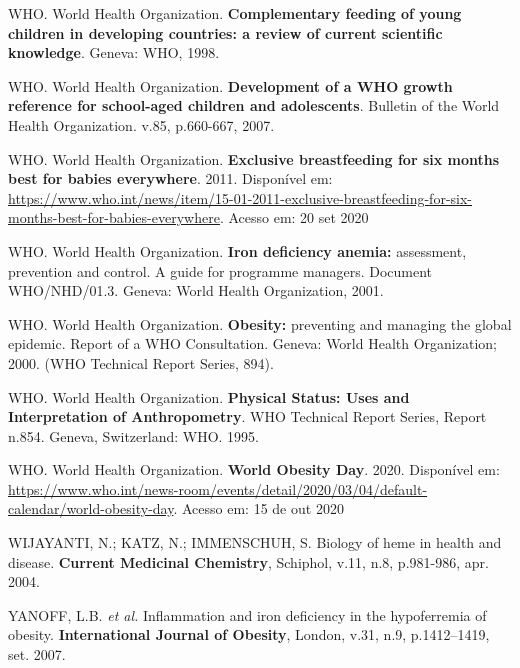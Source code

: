 \noindent WHO. World Health Organization. \textbf{Complementary feeding of young children in developing countries: a review of current scientific knowledge}. Geneva: WHO, 1998.

\bigbreak

\noindent WHO. World Health Organization. \textbf{Development of a WHO growth reference for school-aged children and adolescents}. Bulletin of the World Health Organization. v.85, p.660-667, 2007. 

\bigbreak

\noindent WHO. World Health Organization. \textbf{Exclusive breastfeeding for six months best for babies everywhere}. 2011. Disponível em: \url{https://www.who.int/news/item/15-01-2011-exclusive-breastfeeding-for-six-months-best-for-babies-everywhere}. Acesso em: 20 set 2020

\bigbreak

\noindent WHO. World Health Organization. \textbf{Iron deficiency anemia:} assessment, prevention and control. A guide for programme managers. Document WHO/NHD/01.3. Geneva: World Health Organization, 2001.

\bigbreak

\noindent WHO. World Health Organization. \textbf{Obesity:} preventing and managing the global epidemic. Report of a WHO Consultation. Geneva: World Health Organization; 2000. (WHO Technical Report Series, 894).

\bigbreak

\noindent WHO. World Health Organization. \textbf{Physical Status: Uses and Interpretation of Anthropometry}. WHO Technical Report Series, Report n.854. Geneva, Switzerland: WHO. 1995.

\noindent WHO. World Health Organization. \textbf{World Obesity Day}. 2020. Disponível em: \url{https://www.who.int/news-room/events/detail/2020/03/04/default-calendar/world-obesity-day}. Acesso em: 15 de out 2020

\bigbreak

\noindent WIJAYANTI, N.; KATZ, N.; IMMENSCHUH, S. Biology of heme in health and disease. \textbf{Current Medicinal Chemistry}, Schiphol, v.11, n.8, p.981-986, apr. 2004.

\bigbreak

\noindent YANOFF, L.B. \textit{et al.} Inflammation and iron deficiency in the hypoferremia of obesity. \textbf{International Journal of Obesity}, London, v.31, n.9, p.1412–1419, set. 2007. 

\bigbreak

